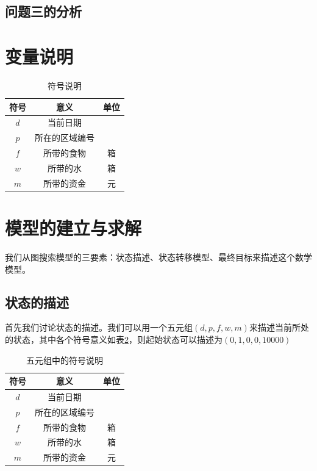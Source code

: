 \documentclass[withoutpreface,bwprint]{cumcmthesis} %
\begin{document}
\subsection{问题三的分析}



\section{变量说明}

\begin{table}[!htbp]
    \caption{符号说明}\label{tab:001} \centering
    \begin{tabular}{ccc}
        \toprule[1.5pt]
        符号 & 意义 & 单位\\
        \midrule[1pt]
        $d$ & 当前日期 & \\
        $p$ & 所在的区域编号 & \\
        $f$ & 所带的食物 & 箱\\
        $w$ & 所带的水 & 箱\\
        $m$ & 所带的资金 & 元\\
        \bottomrule[1.5pt]
    \end{tabular}
\end{table}

\section{模型的建立与求解}

我们从图搜索模型的三要素：状态描述、状态转移模型、最终目标来描述这个数学模型。

\subsection{状态的描述}
首先我们讨论状态的描述。我们可以用一个五元组\((d,p,f,w,m)\)来描述当前所处的状态，其中各个符号意义如表\ref{zt}，则起始状态可以描述为\((0,1,0,0,10000)\)
\begin{table}[!htbp]
    \caption{五元组中的符号说明}\label{tab:001} \centering
    \begin{tabular}{ccc}
        \toprule[1.5pt]
        符号 & 意义 & 单位\\
        \midrule[1pt]
        $d$ & 当前日期 & \\
        $p$ & 所在的区域编号 & \\
        $f$ & 所带的食物 & 箱\\
        $w$ & 所带的水 & 箱\\
        $m$ & 所带的资金 & 元\\
        \bottomrule[1.5pt]
    \end{tabular}
    \label{zt}
\end{table}
\end{document}

